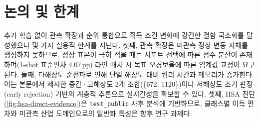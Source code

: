 \section{논의 및 한계}
\label{sec:discussion}

 추가 학습 없이 관측 확장과 순위 통합으로 획득 조건 변화에 강건한 결함 국소화를 달성했으나 몇 가지 실용적 한계를 지닌다.
첫째, 관측 확장은 미관측 정상 변동 자체를 생성하지 못하므로, 정상 표본이 극히 적을 때는 서포트 선택에 따른 점수 분산이 존재하며(1-shot 표준편차 4.07\,pp) 라인 배치 시 목표 오경보율에 따른 임계값 교정이 요구된다.
둘째, 다해상도 순전파로 인해 단일 해상도 대비 쿼리 시간과 메모리가 증가한다. 이는 본문에서 제시한 중간·고해상도 2개 조합(\{672, 1120\})이나 저해상도 조기 판정(early rejection) 기반의 계층적 추론으로 실시간성을 확보할 수 있다.
셋째, HSA 진단(\cref{fig:hsa-direct-evidence})은 \texttt{test\_public} 사후 분석에 기반하므로, 클래스별 이득 편차와 미관측 산업 도메인으로의 일반화 특성은 향후 연구 과제다.
